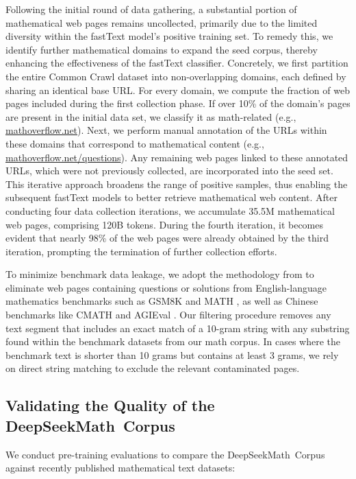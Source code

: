 Following the initial round of data gathering, a substantial portion of mathematical web pages remains uncollected, primarily due to the limited diversity within the fastText model's positive training set. To remedy this, we identify further mathematical domains to expand the seed corpus, thereby enhancing the effectiveness of the fastText classifier. Concretely, we first partition the entire Common Crawl dataset into non-overlapping domains, each defined by sharing an identical base URL. For every domain, we compute the fraction of web pages included during the first collection phase. If over 10\% of the domain’s pages are present in the initial data set, we classify it as math-related (e.g., \url{mathoverflow.net}). Next, we perform manual annotation of the URLs within these domains that correspond to mathematical content (e.g., \url{mathoverflow.net/questions}). Any remaining web pages linked to these annotated URLs, which were not previously collected, are incorporated into the seed set. This iterative approach broadens the range of positive samples, thus enabling the subsequent fastText models to better retrieve mathematical web content. After conducting four data collection iterations, we accumulate 35.5M mathematical web pages, comprising 120B tokens. During the fourth iteration, it becomes evident that nearly 98\% of the web pages were already obtained by the third iteration, prompting the termination of further collection efforts.

To minimize benchmark data leakage, we adopt the methodology from \cite{deepseek-coder} to eliminate web pages containing questions or solutions from English-language mathematics benchmarks such as GSM8K \citep{gsm8k} and MATH \citep{MATH}, as well as Chinese benchmarks like CMATH \citep{wei2023cmath} and AGIEval \citep{agieval}. Our filtering procedure removes any text segment that includes an exact match of a 10-gram string with any substring found within the benchmark datasets from our math corpus. In cases where the benchmark text is shorter than 10 grams but contains at least 3 grams, we rely on direct string matching to exclude the relevant contaminated pages.

\subsection{Validating the Quality of the DeepSeekMath~Corpus}

We conduct pre-training evaluations to compare the DeepSeekMath~Corpus against recently published mathematical text datasets:

